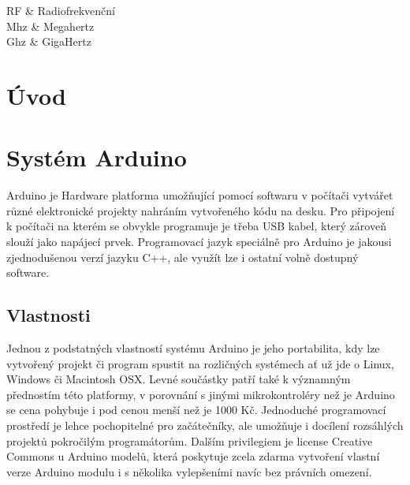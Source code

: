 \documentclass[FM,BP]{tulthesis}
\begin{document}
\begin{abstractCZ}
 
 
\end{abstractCZ}

\begin{abstractEN}


\end{abstractEN}

  
 
\tableofcontents

\clearpage


\begin{abbrList}
    RF & Radiofrekvenční \\
	Mhz & Megahertz \\
	Ghz & GigaHertz \\
\end{abbrList}



\chapter{Úvod}

\chapter {Systém Arduino}
Arduino je Hardware platforma umožňující pomocí softwaru v počítači vytvářet různé elektronické projekty nahráním vytvořeného kódu na desku. Pro připojení k počítači na kterém se obvykle programuje je třeba USB kabel, který zároveň slouží jako napájecí prvek. Programovací jazyk speciálně pro Arduino je jakousi zjednodušenou verzí jazyku C++, ale využít lze i ostatní volně dostupný software.\cite{internet}
\section {Vlastnosti}
Jednou z podstatných vlastností systému Arduino je jeho portabilita, kdy lze vytvořený projekt či program spustit na rozličných systémech ať už jde o Linux, Windows či Macintosh OSX. Levné součástky patří také k významným přednostím této platformy, v porovnání s jinými mikrokontroléry než je Arduino se cena pohybuje i pod cenou menší než je 1000 Kč. Jednoduché programovací prostředí je lehce pochopitelné pro začátečníky, ale umožňuje i docílení rozsáhlých projektů pokročilým programátorům. Dalším privilegiem je license Creative Commons u Arduino modelů, která poskytuje zcela zdarma vytvoření vlastní verze Arduino modulu i s několika vylepšeními navíc bez právních omezení.
\cite{arduino}
\end{document}
